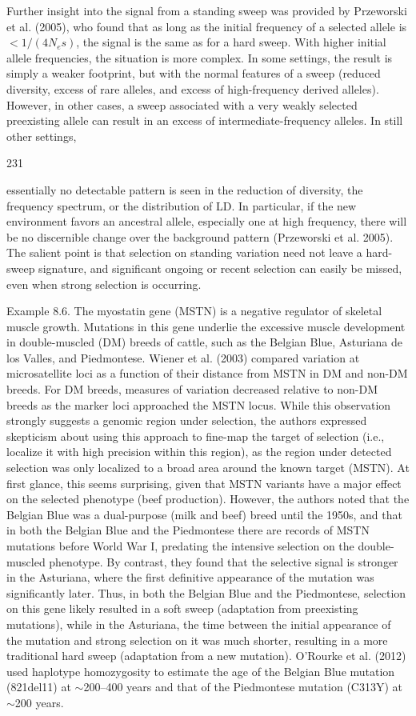 \documentclass{article}
\begin{document}
Further insight into the signal from a standing sweep was provided by Przeworski et al. (2005), who found that as long as the initial frequency of a selected allele is  $ <1/(4N_{e}s) $, the signal is the same as for a hard sweep. With higher initial allele frequencies, the situation is more complex. In some settings, the result is simply a weaker footprint, but with the normal features of a sweep (reduced diversity, excess of rare alleles, and excess of high-frequency derived alleles). However, in other cases, a sweep associated with a very weakly selected preexisting allele can result in an excess of intermediate-frequency alleles. In still other settings,

231

essentially no detectable pattern is seen in the reduction of diversity, the frequency spectrum, or the distribution of LD. In particular, if the new environment favors an ancestral allele, especially one at high frequency, there will be no discernible change over the background pattern (Przeworski et al. 2005). The salient point is that selection on standing variation need not leave a hard-sweep signature, and significant ongoing or recent selection can easily be missed, even when strong selection is occurring.

Example 8.6. The myostatin gene (MSTN) is a negative regulator of skeletal muscle growth. Mutations in this gene underlie the excessive muscle development in double-muscled (DM) breeds of cattle, such as the Belgian Blue, Asturiana de los Valles, and Piedmontese. Wiener et al. (2003) compared variation at microsatellite loci as a function of their distance from MSTN in DM and non-DM breeds. For DM breeds, measures of variation decreased relative to non-DM breeds as the marker loci approached the MSTN locus. While this observation strongly suggests a genomic region under selection, the authors expressed skepticism about using this approach to fine-map the target of selection (i.e., localize it with high precision within this region), as the region under detected selection was only localized to a broad area around the known target (MSTN). At first glance, this seems surprising, given that MSTN variants have a major effect on the selected phenotype (beef production). However, the authors noted that the Belgian Blue was a dual-purpose (milk and beef) breed until the 1950s, and that in both the Belgian Blue and the Piedmontese there are records of MSTN mutations before World War I, predating the intensive selection on the double-muscled phenotype. By contrast, they found that the selective signal is stronger in the Asturiana, where the first definitive appearance of the mutation was significantly later. Thus, in both the Belgian Blue and the Piedmontese, selection on this gene likely resulted in a soft sweep (adaptation from preexisting mutations), while in the Asturiana, the time between the initial appearance of the mutation and strong selection on it was much shorter, resulting in a more traditional hard sweep (adaptation from a new mutation). O'Rourke et al. (2012) used haplotype homozygosity to estimate the age of the Belgian Blue mutation (821del11) at  $ \sim $200–400 years and that of the Piedmontese mutation (C313Y) at  $ \sim $200 years.
\end{document}

